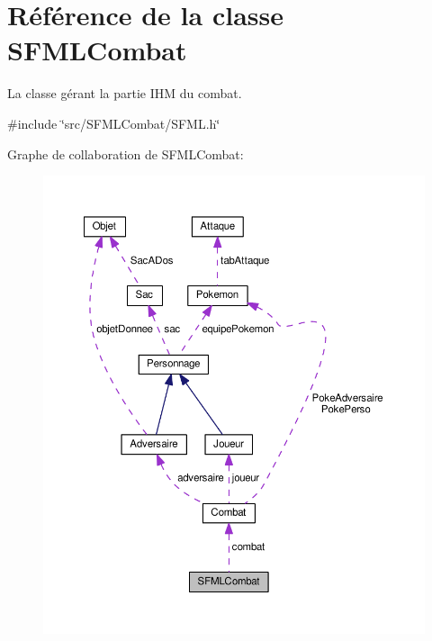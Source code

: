 \hypertarget{class_s_f_m_l_combat}{}\section{Référence de la classe S\+F\+M\+L\+Combat}
\label{class_s_f_m_l_combat}


La classe gérant la partie I\+HM du combat.  




{\ttfamily \#include \char`\"{}src/\+S\+F\+M\+L\+Combat/\+S\+F\+M\+L.\+h\char`\"{}}



Graphe de collaboration de S\+F\+M\+L\+Combat\+:\nopagebreak
\begin{figure}[H]
\begin{center}
\leavevmode
\includegraphics[width=350pt]{class_s_f_m_l_combat__coll__graph}
\end{center}
\end{figure}

